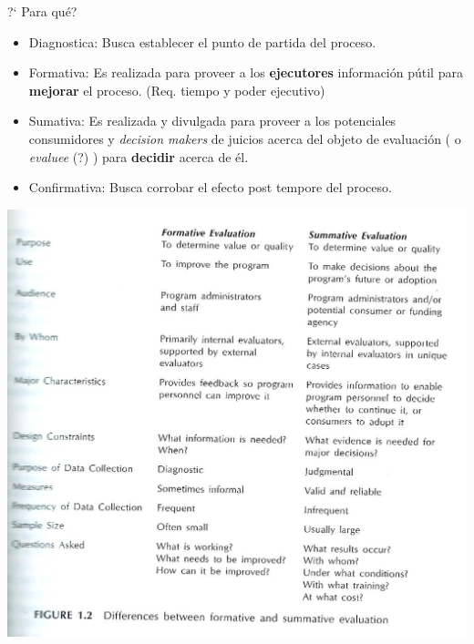 \documentclass{beamer}
\begin{document}
\begin{frame}
\begin{block}{ ?` Para qu\'e?}
\begin{itemize}
\item Diagnostica: Busca establecer el punto de partida del  proceso.  
\item Formativa: Es realizada para proveer a los \textbf{ejecutores}  informaci\'on p\'util para \textbf{mejorar} el proceso. (Req. tiempo y poder ejecutivo) 
\item Sumativa: Es realizada y divulgada para proveer a los potenciales consumidores y \textit{decision makers} de juicios acerca del objeto de evaluaci\'on ( o \textit{evaluee} (?) ) para \textbf{decidir} acerca de \'el.
\item Confirmativa: Busca corrobar el efecto post tempore del proceso.
\end{itemize}
\end{block}
\end{frame}

\begin{frame}
\begin{center}
\includegraphics[scale=0.65]{tabla_formativa_sumativa.jpg}
\end{center}
\end{frame}
\end{document}
